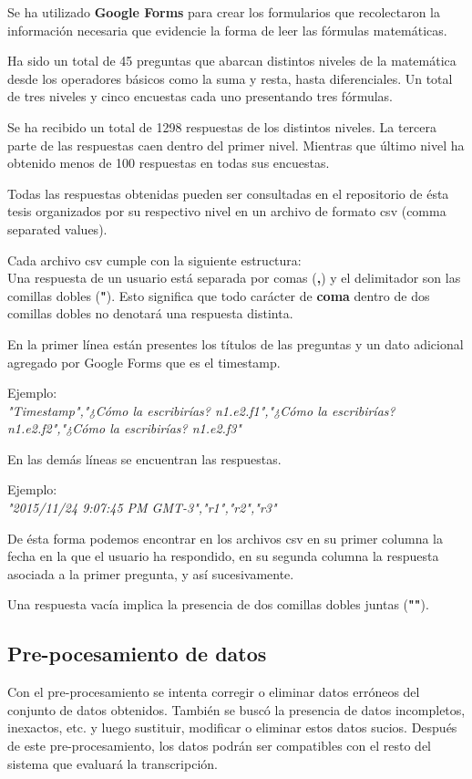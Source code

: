 Se ha utilizado \textbf{Google Forms} para crear los formularios que recolectaron la información necesaria que evidencie la forma de leer las fórmulas matemáticas.

Ha sido un total de 45 preguntas\cite{10} que abarcan distintos niveles de la matemática desde los operadores básicos como la suma y resta, hasta diferenciales. Un total de tres niveles y cinco encuestas cada uno presentando tres fórmulas.

Se ha recibido un total de 1298 respuestas de los distintos niveles. La tercera parte de las respuestas caen dentro del primer nivel. Mientras que último nivel ha obtenido menos de 100 respuestas en todas sus encuestas.

Todas las respuestas obtenidas pueden ser consultadas en el repositorio de ésta tesis organizados por su respectivo nivel en un archivo de formato csv (comma separated values).

Cada archivo csv cumple con la siguiente estructura:\\
Una respuesta de un usuario está separada por comas (\textbf{,}) y el delimitador son las comillas dobles (\textbf{"}). Esto significa que todo carácter de \textbf{coma} dentro de dos comillas dobles no denotará una respuesta distinta.

En la primer línea están presentes los títulos de las preguntas y un dato adicional agregado por Google Forms que es el timestamp.

Ejemplo:\\
\textit{"Timestamp","¿Cómo la escribirías? n1.e2.f1","¿Cómo la escribirías? n1.e2.f2","¿Cómo la escribirías? n1.e2.f3"}

En las demás líneas se encuentran las respuestas.

Ejemplo:\\
\textit{"2015/11/24 9:07:45 PM GMT-3","r1","r2","r3"}

De ésta forma podemos encontrar en los archivos csv en su primer columna la fecha en la que el usuario ha respondido, en su segunda columna la respuesta asociada a la primer pregunta, y así sucesivamente.

Una respuesta vacía implica la presencia de dos comillas dobles juntas (\textbf{""}).

\subsection{Pre-pocesamiento de datos}
Con el pre-procesamiento se intenta corregir o eliminar datos erróneos del conjunto de datos obtenidos. También se buscó la presencia de datos incompletos, inexactos, etc. y luego sustituir, modificar o eliminar estos datos sucios. Después de este pre-procesamiento, los datos podrán ser compatibles con el resto del sistema que evaluará la transcripción.

